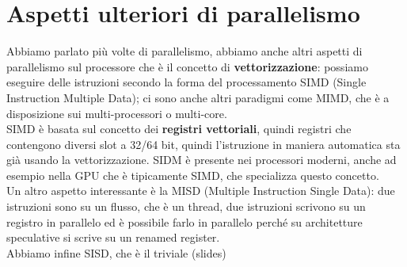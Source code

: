 \documentclass[12pt, oneside]{extbook}
\begin{document}
\section{Aspetti ulteriori di parallelismo}
Abbiamo parlato più volte di parallelismo, abbiamo anche altri aspetti di parallelismo sul processore che è il concetto di \textbf{vettorizzazione}: possiamo eseguire delle istruzioni secondo la forma del processamento SIMD (Single Instruction Multiple Data); ci sono anche altri paradigmi come MIMD, che è a disposizione sui multi-processori o multi-core.\\ SIMD è basata sul concetto dei \textbf{registri vettoriali}, quindi registri che contengono diversi slot a 32/64 bit, quindi l'istruzione in maniera automatica sta già usando la vettorizzazione. SIDM è presente nei processori moderni, anche ad esempio nella GPU che è tipicamente SIMD, che specializza questo concetto. \\ Un altro aspetto interessante è la MISD (Multiple Instruction Single Data): due istruzioni sono su un flusso, che è un thread, due istruzioni scrivono su un registro in parallelo ed è possibile farlo in parallelo perché su architetture speculative si scrive su un renamed register.\\ Abbiamo infine SISD, che è il triviale (slides)
\end{document}
